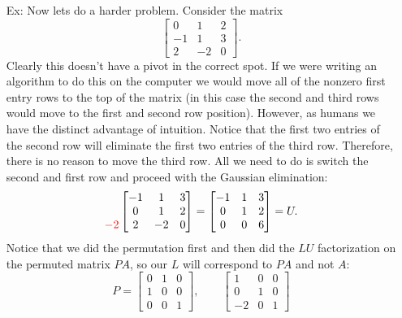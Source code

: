 \documentclass[reqno]{amsart}
\theoremstyle{definition}
\begin{document}
\begin{itemize}
\item[Ex:  ]  Now lets do a harder problem.  Consider the matrix
%
\begin{equation*}
\begin{bmatrix}
0 & 1 & 2\\
-1 & 1 & 3\\
2 & -2 & 0
\end{bmatrix}.
\end{equation*}
%
Clearly this doesn't have a pivot in the correct spot.  If we were writing an algorithm to do this on the computer we would move all of the nonzero first entry rows to the top of the matrix (in this case the second and third rows would move to the first and second row position).  However, as humans we have the distinct advantage of intuition.  Notice that the first two entries of the second row will eliminate the first two entries of the third row.  Therefore, there is no reason to move the third row.  All we need to do is switch the second and first row and proceed with the Gaussian elimination:
%
\begin{equation*}
\begin{matrix}
 \\
 \\
{\color{red}-2}
\end{matrix}\begin{bmatrix}
-1 & 1 & 3\\
0 & 1 & 2\\
2 & -2 & 0
\end{bmatrix} = \begin{bmatrix}
-1 & 1 & 3\\
0 & 1 & 2\\
0 & 0 & 6
\end{bmatrix} = U.
\end{equation*}
%
Notice that we did the permutation first and then did the $LU$ factorization on the permuted matrix $PA$, so our $L$ will correspond to $PA$ and not $A$:
%
\begin{equation*}
P = \begin{bmatrix}
0 & 1 & 0\\
1 & 0 & 0\\
0 & 0 & 1
\end{bmatrix},\qquad \begin{bmatrix}
1 & 0 & 0\\
0 & 1 & 0\\
-2 & 0 & 1
\end{bmatrix}
\end{equation*}


\end{itemize}
\end{document}
